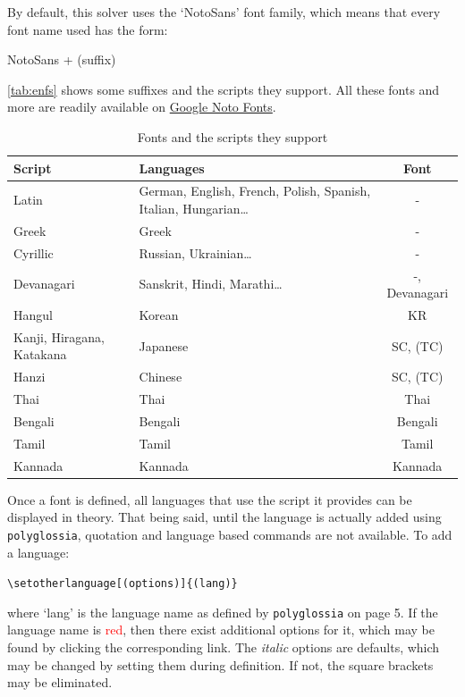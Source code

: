 \documentclass[12pt,twoside]{article}
\newcommand*{\bt}[1]{\textbf{#1}}
\newenvironment{syntax}{\def\FrameCommand{\colorbox{ruler}} \MakeFramed{\advance\hsize+\width}\begin{center}}{\end{center}\endMakeFramed}
\begin{document}
By default, this solver uses the `NotoSans' font family, which means that every font name used has the form:
\begin{syntax}
NotoSans + (suffix)
\end{syntax}
\autoref{tab:enfs} shows some suffixes and the scripts they support. All these fonts and more are readily available on \href{https://fonts.google.com/?query=noto+sans+&preview.script=Latn&preview.lang=pl_Latn}{Google Noto Fonts}.
\begin{table}[bth]
    \centering
    \begin{tabular}{|m{3cm}|m{6.5cm}|c|}
        \hline \bt{Script} & \bt{Languages} & \bt{Font}\\\hline
        Latin & German, English, French, Polish, Spanish, Italian, Hungarian\ldots & -\\\hline
        Greek & Greek & -\\\hline
        Cyrillic & Russian, Ukrainian\ldots & -\\\hline
        Devanagari & Sanskrit, Hindi, Marathi\ldots & -, Devanagari\\\hline
        Hangul & Korean & KR\\\hline
        Kanji, Hiragana, Katakana & Japanese & SC, (TC)\\\hline
        Hanzi & Chinese & SC, (TC)\\\hline
        Thai & Thai & Thai\\\hline
        Bengali & Bengali & Bengali\\\hline
        Tamil & Tamil & Tamil\\\hline
        Kannada & Kannada & Kannada\\\hline
    \end{tabular}
    \caption{Fonts and the  scripts they support}
    \label{tab:enfs}
\end{table}

Once a font is defined, all languages that use the  script it provides can be displayed in theory. That being said, until the language is actually added using \texttt{polyglossia}, quotation and language based commands are not available. To add a language:
\begin{syntax}
\verb|\setotherlanguage[(options)]{(lang)}|
\end{syntax}
where `lang' is the language name as defined by \texttt{polyglossia} on page 5. If the language name is \textcolor{red}{red}, then there exist additional options for it, which may be found by clicking the corresponding link. The \textit{italic} options are defaults, which may be changed by setting them during definition. If not, the square brackets may be eliminated. 
\end{document}
